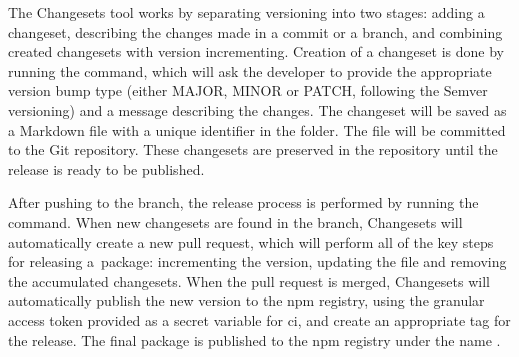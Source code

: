 The Changesets tool works by separating versioning into two stages: adding a changeset, describing the changes made in a commit or a branch, and combining created changesets with version incrementing. Creation of a changeset is done by running the  command, which will ask the developer to provide the appropriate version bump type (either MAJOR, MINOR or PATCH, following the Semver versioning) and a message describing the changes. The changeset will be saved as a Markdown file with a unique identifier in the  folder. The file will be committed to the Git repository. These changesets are preserved in the repository until the release is ready to be published.

After pushing to the  branch, the release process is performed by running the  command. When new changesets are found in the  branch, Changesets will automatically create a new pull request, which will perform all of the key steps for releasing a~package: incrementing the version, updating the  file and removing the accumulated changesets. When the pull request is merged, Changesets will automatically publish the new version to the \acrshort{npm} registry, using the granular access token provided as a secret variable for \acrshort{ci}, and create an appropriate  tag for the release. The final package is published to the \acrshort{npm} registry under the name  \cite{Tsmathevaluate2023}. 